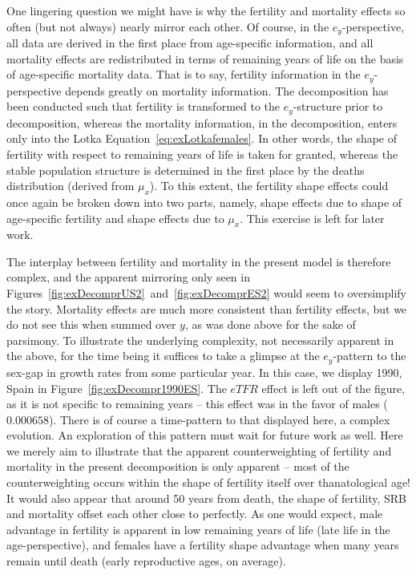  One lingering question we might have is why the fertility and mortality effects
 so often (but not always) nearly mirror each other. Of course, in the
 $e_y$-perspective, all data are derived in the first place from age-specific information, and all mortality
 effects are redistributed in terms of remaining years of life on the basis of
 age-specific mortality data. That is to say, fertility information in the
 $e_y$-perspective depends greatly on mortality information. The decomposition
 has been conducted such that fertility is transformed to the $e_y$-structure
 prior to decomposition, whereas the mortality information, in the
 decomposition, enters only into the Lotka Equation~\eqref{eq:exLotkafemales}.
 In other words, the shape of fertility with respect to remaining years of life is
 taken for granted, whereas the stable population structure is determined in the
 first place by the deaths distribution (derived from $\mu_x$). To this extent,
 the fertility shape effects could once again be broken down into two parts,
 namely, shape effects due to shape of age-specific fertility and shape effects
 due to $\mu_x$. This exercise is left for later work. 
 
The interplay between fertility and mortality in the present model is therefore
complex, and the apparent mirroring only seen in
Figures~\ref{fig:exDecomprUS2}~and~\ref{fig:exDecomprES2} would seem to
oversimplify the story. Mortality effects are much more consistent than
fertility effects, but we do not see this when summed over $y$, as was done
above for the sake of parsimony. To illustrate the underlying complexity, not
necessarily apparent in the above, for the time being it suffices to take a
glimpse at the $e_y$-pattern to the sex-gap in growth rates from some particular
year. In this case, we display 1990, Spain in Figure~\ref{fig:exDecompr1990ES}.
The $eTFR$ effect is left out of the figure, as it is not specific to
remaining years -- this effect was in the favor of males ($0.000658$). There is
of course a time-pattern to that displayed here, a complex evolution. An exploration 
of this pattern must wait for future work as well. Here we merely aim to illustrate 
that the apparent counterweighting of fertility and mortality in the present decomposition is only
apparent -- most of the counterweighting occurs within the shape of fertility
itself over thanatological age! It would also appear that around 50 years from
death, the shape of fertility, SRB and mortality offset each other close to
perfectly. As one would expect, male advantage in fertility is apparent in low
remaining years of life (late life in the age-perspective), and females have a
fertility shape advantage when many years remain until death (early
reproductive ages, on average). 

